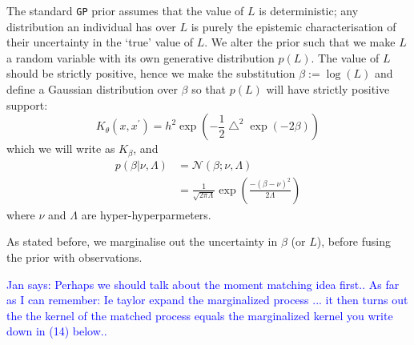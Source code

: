 \documentclass{article}
\newcommand\jansays[1]{\textcolor{blue}{Jan says: #1}}
\begin{document}
The standard \verb"GP" prior assumes that the value of $L$ is deterministic; any distribution an individual has over $L$ is purely the epistemic characterisation of their uncertainty in the `true' value of $L$. We alter the prior such that we make $L$ a random variable with its own generative distribution $p(L)$. The value of $L$ should be strictly positive, %
hence we make the substitution $\beta := \log(L)$ and define a Gaussian distribution over $\beta$ so that $p(L)$ will have strictly positive support: 
\begin{equation}\label{betaSEkernel}
K_\theta(x,x^\prime) = h^2 \exp \left( -\frac{1}{2}\bigtriangleup^2 \exp(-2\beta) \right)
\end{equation}
which we will write as $K_\beta$, and
\begin{align}
p(\beta|\nu,\Lambda) &= \mathcal{N}(\beta; \nu, \Lambda) \nonumber\\
&= \frac{1}{\sqrt{2 \pi \Lambda}} \exp \left( \frac{ -(\beta - \nu)^2}{2\Lambda} \right) \label{betapdf}
\end{align}
where $\nu$ and $\Lambda$ are hyper-hyperparmeters.

As stated before, we marginalise out the uncertainty in $\beta$ (or $L$), before fusing the prior with observations. 

\jansays{Perhaps we should talk about the moment matching idea first.. As far as I can remember: Ie taylor expand the marginalized process ... it then turns out the the kernel of the matched process equals the marginalized kernel you write down in (14) below..}
\end{document}
